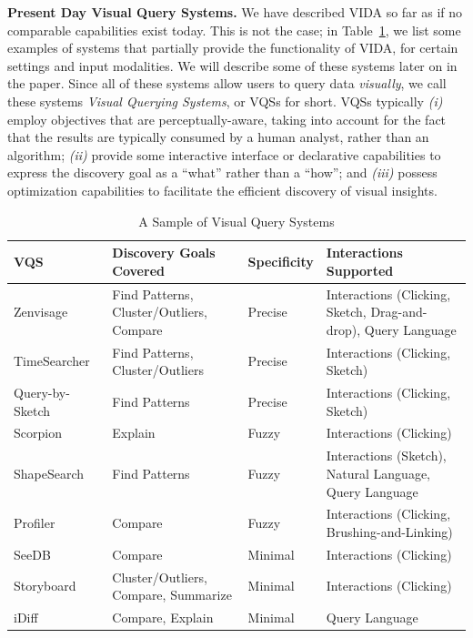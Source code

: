 \documentclass[11pt]{article}
\newcommand{\stitle}[1]{\par\noindent\textbf{#1}}
\newcommand{\vida}{\textsc{VIDA}\xspace}
\begin{document}
\par
\stitle{Present Day Visual Query Systems.}
We have described \vida so far as if no comparable capabilities
exist today.
This is not the case; in Table~\ref{fig:table}, we list some examples of systems
that partially provide the functionality of \vida,
for certain settings and input modalities.
We will describe some of these systems later on in the paper. 
Since all of these systems allow users to query data {\em visually},
we call these systems {\em Visual Querying Systems}, or VQSs for short.
VQSs typically {\em (i)} 
employ objectives that are perceptually-aware,
taking into account for the fact that the results are typically
consumed by a human analyst, rather than an algorithm;
{\em (ii)} provide some interactive interface or declarative capabilities
to express the discovery goal as a ``what'' rather than a ``how'';
and {\em (iii)} possess optimization capabilities to facilitate
the efficient discovery of visual insights. 


\begin{table}[!t]
\scriptsize
\centering
\begin{tabular}{l|l|l|p{7.5cm}}
VQS & Discovery Goals Covered & Specificity & Interactions Supported \\ \hline

Zenvisage~\cite{Lee2017,Siddiqui2016} & Find Patterns, Cluster/Outliers, Compare & Precise & Interactions (Clicking, Sketch, Drag-and-drop), Query Language \\
TimeSearcher~\cite{hochheiser2004dynamic} & Find Patterns, Cluster/Outliers & Precise & Interactions (Clicking, Sketch) \\ 
Query-by-Sketch~\cite{wattenberg2001sketching} & Find Patterns & Precise & Interactions (Clicking, Sketch) \\ 

Scorpion~\cite{Wu2013} & Explain & Fuzzy & Interactions (Clicking) \\

ShapeSearch~\cite{Siddiqui2018} & Find Patterns & Fuzzy & Interactions (Sketch), Natural Language, Query Language \\

Profiler~\cite{Kandel2012} & Compare & Fuzzy & Interactions (Clicking, Brushing-and-Linking) \\
SeeDB~\cite{Vartak2015} & Compare & Minimal & Interactions (Clicking) \\
Storyboard~\cite{Lee2018} & Cluster/Outliers, Compare, Summarize & Minimal & Interactions (Clicking) \\
iDiff~\cite{Sarawagi1998,Sarawagi2000} & Compare, Explain & Minimal & Query Language \\

\end{tabular}
\vspace{-10pt}
\caption{A Sample of Visual Query Systems}\label{fig:table}
\vspace{-10pt}
\end{table}
\end{document}
